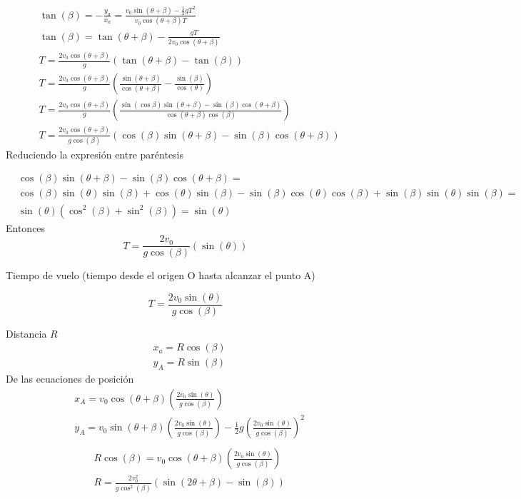 \begin{align*}
    &\tan{(\beta)}=-\frac{y_a}{x_a}=\frac{v_0\sin{(\theta+\beta)}-\frac{1}{2}gT^2}{v_0\cos{(\theta+\beta)}T}\\
    &\tan{(\beta)}=\tan{(\theta+\beta)}-\frac{gT}{2v_0\cos{(\theta+\beta)}}\\
    &T=\frac{2v_0\cos{(\theta+\beta)}}{g}\left(\tan{(\theta+\beta)}-\tan{(\beta)}\right)\\
    &T=\frac{2v_0\cos{(\theta+\beta)}}{g}\left(\frac{\sin{(\theta+\beta)}}{\cos{(\theta+\beta)}}-\frac{\sin{(\beta)}}{\cos{(\theta)}}\right)\\
    &T=\frac{2v_0\cos{(\theta+\beta)}}{g}\left(\frac{\sin{(\cos{\beta})}\sin{(\theta+\beta)}-\sin{(\beta)}\cos{(\theta+\beta)}}{\cos{(\theta+\beta)}\cos{(\beta)}} \right)\\
    &T=\frac{2v_0\cos{(\theta+\beta)}}{g\cos{(\beta)}}\left(\cos{(\beta)}\sin{(\theta+\beta)}-\sin{(\beta)}\cos{(\theta+\beta)}\right)
\end{align*}
Reduciendo la expresión entre paréntesis

\begin{align*}
    &\cos{(\beta)}\sin{(\theta+\beta)}-\sin{(\beta)}\cos{(\theta+\beta)}=\\
    &\cos{(\beta)}\sin{(\theta)}\sin{(\beta)}+\cos{(\theta)}\sin{(\beta)}-\sin{(\beta)}\cos{(\theta)}\cos{(\beta)}+\sin{(\beta)}\sin{(\theta)}\sin{(\beta)}=\\
    &\sin{(\theta)}\left(\cos^2{(\beta)}+\sin^2{(\beta)}\right)=\sin{(\theta)}
\end{align*}
Entonces
\begin{equation*}
    T=\frac{2v_0}{g\cos{(\beta)}}\left(\sin{(\theta)}\right)
\end{equation*}

Tiempo de vuelo (tiempo desde el origen O hasta alcanzar el punto A)

\begin{equation}
    T=\frac{2v_0\sin{(\theta)}}{g\cos{(\beta)}}
\end{equation}

Distancia $R$
\begin{align}
    &x_a=R\cos{(\beta)}\\
    &y_A=R\sin{(\beta)}
\end{align}
De las ecuaciones de posición
\begin{align*}
        &x_A=v_0\cos{(\theta+\beta)}\left(\frac{2v_0\sin{(\theta)}}{g\cos{(\beta)}}\right)\\
        &y_A=v_0\sin{(\theta+\beta)}\left(\frac{2v_0\sin{(\theta)}}{g\cos{(\beta)}}\right)-\frac{1}{2}g\left(\frac{2v_0\sin{(\theta)}}{g\cos{(\beta)}}\right)^2\\
\end{align*}
\begin{align*}
    &R\cos{(\beta)}=v_0\cos{(\theta+\beta)}\left(\frac{2v_0\sin{(\theta)}}{g\cos{(\beta)}}\right)\\
    &R=\frac{2v_0^2}{g\cos^2{(\beta)}}\left(\sin{(2\theta+\beta)}-\sin{(\beta)}\right)
\end{align*}

